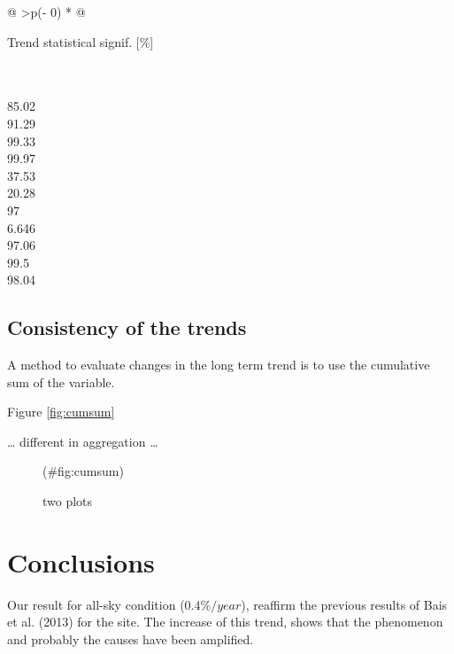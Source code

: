\documentclass[
  preprint, 3p, authoryear]{article}
\begin{document}
\begin{longtable}[]{@{}
  >{\centering\arraybackslash}p{(\columnwidth - 0\tabcolsep) * }@{}}
\toprule
\begin{minipage}[b]{\linewidth}\centering
Trend statistical signif. {[}\%{]}
\end{minipage} \\
\midrule
{} \\
85.02 \\
91.29 \\
99.33 \\
99.97 \\
37.53 \\
20.28 \\
97 \\
6.646 \\
97.06 \\
99.5 \\
98.04 \\
\bottomrule
\end{longtable}

\hypertarget{consistency-of-the-trends}{%
\subsection{Consistency of the trends}\label{consistency-of-the-trends}}

A method to evaluate changes in the long term trend is to use the cumulative sum of the variable.

Figure \ref{fig:cumsum}

\ldots{} different in aggregation \ldots{}

\begin{figure}[h!]

{\centering {}

}

\caption{two plots}(\#fig:cumsum)
\end{figure}

\hypertarget{conclusions}{%
\section{Conclusions}\label{conclusions}}

Our result for all-sky condition (\(0.4\%/year\)), reaffirm the previous results of Bais et al. (2013) for the site.
The increase of this trend, shows that the phenomenon and probably the causes have been amplified.
\end{document}
